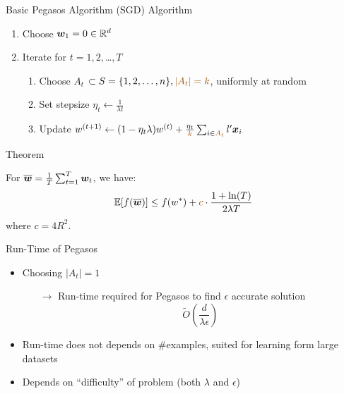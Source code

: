 \begin{frame}{Basic Pegasos Algorithm (SGD)}
    {\color{blue} Algorithm}

    \begin{enumerate} 
        \item Choose $\bm{w}_1 = 0 \in \mathbb{R}^d$
        \item Iterate for $t = 1,2,$\ldots$,T$
        \begin{enumerate}
            \item Choose {\color{red} $A_t$} $\subset S = \{1,2,\ldots,n\},{\color{red}|A_t|=k}$, uniformly at random
            \item Set stepsize $\eta_t \leftarrow \frac{1}{\lambda t}$
            \item Update $w^{(t+1)} \leftarrow (1-\eta_t\lambda)w^{(t)} + \frac{\eta_t}{\color{red}k} \sum_{i\in {\color{red} A_t}} l' \xv_i$
        \end{enumerate}
    \end{enumerate}

    {\color{blue} Theorem}

    For $\overline{\bm{w}} = \frac1T \sum_{t=1}^T \bm{w}_t $, we have:
    \[
         \E[f(\overline{\wv})]\le f(w^*) + {\color{red} c} \cdot \frac{1+\ln(T)}{2\lambda T}
    \]
    where $c=4R^2$.
\end{frame}

\begin{frame}{Run-Time of Pegasos}
    \begin{itemize}
        \item Choosing $|A_t|=1$%
            \begin{itemize}
                \item[$\rightarrow$] Run-time required for Pegasos to find $\epsilon$ accurate solution %
            \[
                \tilde{O}(\frac{d}{\lambda \epsilon})
            \]
            \end{itemize}
        \item Run-time does not depends on \#examples, suited for learning form large datasets
        \item Depends on ``difficulty'' of problem (both $\lambda$ and $\epsilon$)
    \end{itemize}
\end{frame}

